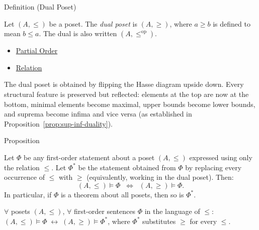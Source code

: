 \begin{definitionbox}{Definition (Dual Poset)}
\begin{definition}\label{def:dual-poset}
Let $(A, \leq)$ be a poset.  The \emph{dual poset} is $(A, \geq)$, where
$a \geq b$ is defined to mean $b \leq a$.  The dual is also written
$(A, \leq^{\mathrm{op}})$.
\end{definition}
\end{definitionbox}

\begin{dependencies}
\begin{itemize}
  \item \hyperref[def:partial-order]{Partial Order}
  \item \hyperref[def:relation]{Relation}
\end{itemize}
\end{dependencies}

\begin{remark*}[Intuition]
\label{rem:dual-intuition}
The dual poset is obtained by flipping the Hasse diagram upside down.  Every
structural feature is preserved but reflected: elements at the top are now at
the bottom, minimal elements become maximal, upper bounds become lower bounds,
and suprema become infima and vice versa (as established in
Proposition~\ref{prop:sup-inf-duality}).
\end{remark*}


\begin{propositionbox}{Proposition}
\begin{proposition}
\label{prop:order-duality}
Let $\Phi$ be any first-order statement about a poset $(A, \leq)$ expressed
using only the relation $\leq$.  Let $\Phi^*$ be the statement obtained from
$\Phi$ by replacing every occurrence of $\leq$ with $\geq$ (equivalently,
working in the dual poset).  Then:
\[
  (A, \leq) \models \Phi
  \;\;\Longleftrightarrow\;\;
  (A, \geq) \models \Phi.
\]
In particular, if $\Phi$ is a theorem about all posets, then so is $\Phi^*$.
\end{proposition}
\end{propositionbox}

\begin{remark*}
$\forall$ posets $(A,\leq)$, $\forall$ first-order sentences $\Phi$ in the
language of $\leq$: $(A,\leq)\models\Phi \;\leftrightarrow\; (A,\geq)\models\Phi^*$,
where $\Phi^*$ substitutes $\geq$ for every $\leq$.
\end{remark*}

